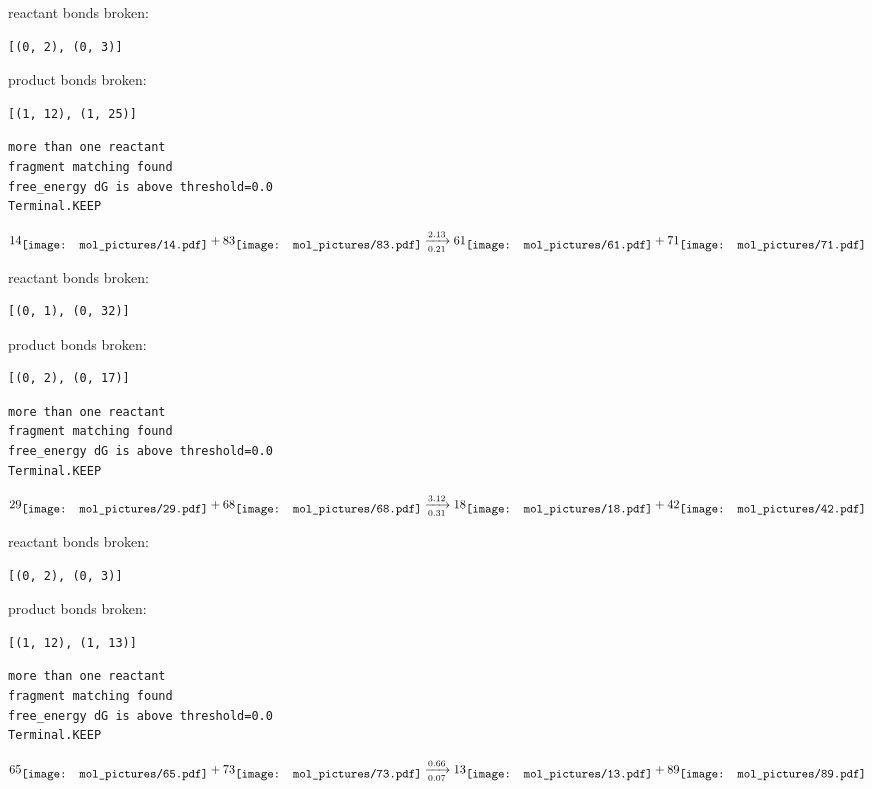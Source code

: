 \documentclass{article}
\begin{document}
reactant bonds broken:\begin{verbatim}
[(0, 2), (0, 3)]
\end{verbatim}
product bonds broken:\begin{verbatim}
[(1, 12), (1, 25)]
\end{verbatim}




\vspace{1cm}
\begin{verbatim}
more than one reactant
fragment matching found
free_energy dG is above threshold=0.0
Terminal.KEEP
\end{verbatim}
$$
14
\raisebox{-.5\height}{\texttt{[image: mol\_pictures/14.pdf]}}
+
83
\raisebox{-.5\height}{\texttt{[image: mol\_pictures/83.pdf]}}
\xrightarrow[0.21]{2.13}
61
\raisebox{-.5\height}{\texttt{[image: mol\_pictures/61.pdf]}}
+
71
\raisebox{-.5\height}{\texttt{[image: mol\_pictures/71.pdf]}}
$$


reactant bonds broken:\begin{verbatim}
[(0, 1), (0, 32)]
\end{verbatim}
product bonds broken:\begin{verbatim}
[(0, 2), (0, 17)]
\end{verbatim}




\vspace{1cm}
\begin{verbatim}
more than one reactant
fragment matching found
free_energy dG is above threshold=0.0
Terminal.KEEP
\end{verbatim}
$$
29
\raisebox{-.5\height}{\texttt{[image: mol\_pictures/29.pdf]}}
+
68
\raisebox{-.5\height}{\texttt{[image: mol\_pictures/68.pdf]}}
\xrightarrow[0.31]{3.12}
18
\raisebox{-.5\height}{\texttt{[image: mol\_pictures/18.pdf]}}
+
42
\raisebox{-.5\height}{\texttt{[image: mol\_pictures/42.pdf]}}
$$


reactant bonds broken:\begin{verbatim}
[(0, 2), (0, 3)]
\end{verbatim}
product bonds broken:\begin{verbatim}
[(1, 12), (1, 13)]
\end{verbatim}




\vspace{1cm}
\begin{verbatim}
more than one reactant
fragment matching found
free_energy dG is above threshold=0.0
Terminal.KEEP
\end{verbatim}
$$
65
\raisebox{-.5\height}{\texttt{[image: mol\_pictures/65.pdf]}}
+
73
\raisebox{-.5\height}{\texttt{[image: mol\_pictures/73.pdf]}}
\xrightarrow[0.07]{0.66}
13
\raisebox{-.5\height}{\texttt{[image: mol\_pictures/13.pdf]}}
+
89
\raisebox{-.5\height}{\texttt{[image: mol\_pictures/89.pdf]}}
$$
\end{document}
